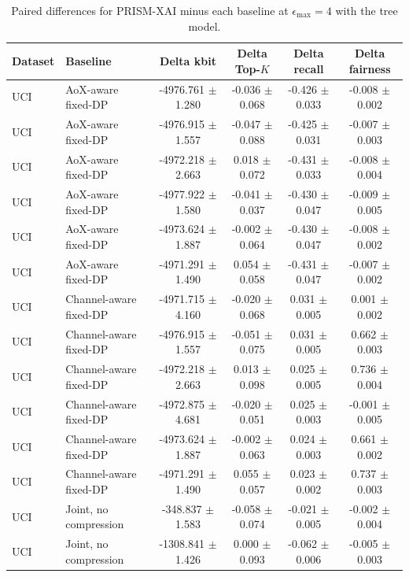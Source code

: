 \begin{table}[t]
\caption{Paired differences for PRISM-XAI minus each baseline at $\epsilon_{\max}=4$ with the tree model.}
\label{tab:paired-differences}
\centering
\scriptsize
\setlength{\tabcolsep}{3pt}
\begin{tabular}{llcccc}
\toprule
Dataset & Baseline & Delta kbit & Delta Top-$K$ & Delta recall & Delta fairness \\
\midrule
UCI & AoX-aware fixed-DP & -4976.761 $\pm$ 1.280 & -0.036 $\pm$ 0.068 & -0.426 $\pm$ 0.033 & -0.008 $\pm$ 0.002 \\
UCI & AoX-aware fixed-DP & -4976.915 $\pm$ 1.557 & -0.047 $\pm$ 0.088 & -0.425 $\pm$ 0.031 & -0.007 $\pm$ 0.003 \\
UCI & AoX-aware fixed-DP & -4972.218 $\pm$ 2.663 & 0.018 $\pm$ 0.072 & -0.431 $\pm$ 0.033 & -0.008 $\pm$ 0.004 \\
UCI & AoX-aware fixed-DP & -4977.922 $\pm$ 1.580 & -0.041 $\pm$ 0.037 & -0.430 $\pm$ 0.047 & -0.009 $\pm$ 0.005 \\
UCI & AoX-aware fixed-DP & -4973.624 $\pm$ 1.887 & -0.002 $\pm$ 0.064 & -0.430 $\pm$ 0.047 & -0.008 $\pm$ 0.002 \\
UCI & AoX-aware fixed-DP & -4971.291 $\pm$ 1.490 & 0.054 $\pm$ 0.058 & -0.431 $\pm$ 0.047 & -0.007 $\pm$ 0.002 \\
UCI & Channel-aware fixed-DP & -4971.715 $\pm$ 4.160 & -0.020 $\pm$ 0.068 & 0.031 $\pm$ 0.005 & 0.001 $\pm$ 0.002 \\
UCI & Channel-aware fixed-DP & -4976.915 $\pm$ 1.557 & -0.051 $\pm$ 0.075 & 0.031 $\pm$ 0.005 & 0.662 $\pm$ 0.003 \\
UCI & Channel-aware fixed-DP & -4972.218 $\pm$ 2.663 & 0.013 $\pm$ 0.098 & 0.025 $\pm$ 0.005 & 0.736 $\pm$ 0.004 \\
UCI & Channel-aware fixed-DP & -4972.875 $\pm$ 4.681 & -0.020 $\pm$ 0.051 & 0.025 $\pm$ 0.003 & -0.001 $\pm$ 0.005 \\
UCI & Channel-aware fixed-DP & -4973.624 $\pm$ 1.887 & -0.002 $\pm$ 0.063 & 0.024 $\pm$ 0.003 & 0.661 $\pm$ 0.002 \\
UCI & Channel-aware fixed-DP & -4971.291 $\pm$ 1.490 & 0.055 $\pm$ 0.057 & 0.023 $\pm$ 0.002 & 0.737 $\pm$ 0.003 \\
UCI & Joint, no compression & -348.837 $\pm$ 1.583 & -0.058 $\pm$ 0.074 & -0.021 $\pm$ 0.005 & -0.002 $\pm$ 0.004 \\
UCI & Joint, no compression & -1308.841 $\pm$ 1.426 & 0.000 $\pm$ 0.093 & -0.062 $\pm$ 0.006 & -0.005 $\pm$ 0.003 \\

\end{tabular}
\end{table}
